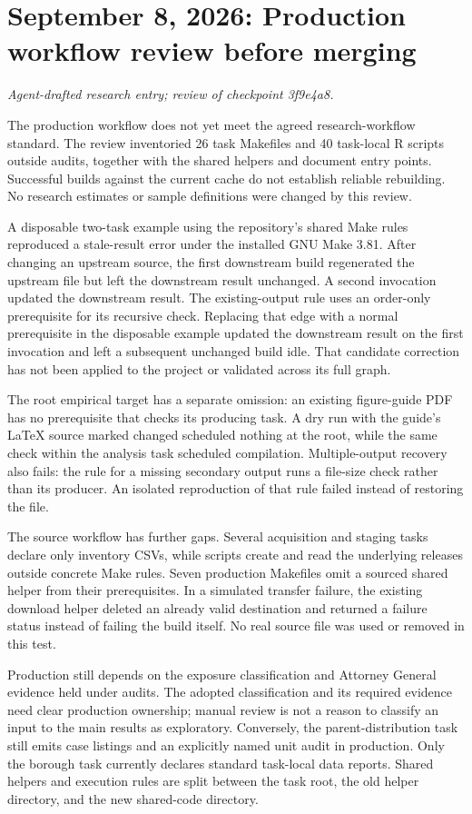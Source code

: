 \clearpage
\section*{September 8, 2026: Production workflow review before merging}
\textit{Agent-drafted research entry; review of checkpoint 3f9e4a8.}

The production workflow does not yet meet the agreed research-workflow standard. The review inventoried 26 task Makefiles and 40 task-local R scripts outside audits, together with the shared helpers and document entry points. Successful builds against the current cache do not establish reliable rebuilding. No research estimates or sample definitions were changed by this review.

A disposable two-task example using the repository's shared Make rules reproduced a stale-result error under the installed GNU Make 3.81. After changing an upstream source, the first downstream build regenerated the upstream file but left the downstream result unchanged. A second invocation updated the downstream result. The existing-output rule uses an order-only prerequisite for its recursive check. Replacing that edge with a normal prerequisite in the disposable example updated the downstream result on the first invocation and left a subsequent unchanged build idle. That candidate correction has not been applied to the project or validated across its full graph.

The root empirical target has a separate omission: an existing figure-guide PDF has no prerequisite that checks its producing task. A dry run with the guide's LaTeX source marked changed scheduled nothing at the root, while the same check within the analysis task scheduled compilation. Multiple-output recovery also fails: the rule for a missing secondary output runs a file-size check rather than its producer. An isolated reproduction of that rule failed instead of restoring the file.

The source workflow has further gaps. Several acquisition and staging tasks declare only inventory CSVs, while scripts create and read the underlying releases outside concrete Make rules. Seven production Makefiles omit a sourced shared helper from their prerequisites. In a simulated transfer failure, the existing download helper deleted an already valid destination and returned a failure status instead of failing the build itself. No real source file was used or removed in this test.

Production still depends on the exposure classification and Attorney General evidence held under audits. The adopted classification and its required evidence need clear production ownership; manual review is not a reason to classify an input to the main results as exploratory. Conversely, the parent-distribution task still emits case listings and an explicitly named unit audit in production. Only the borough task currently declares standard task-local data reports. Shared helpers and execution rules are split between the task root, the old helper directory, and the new shared-code directory.

